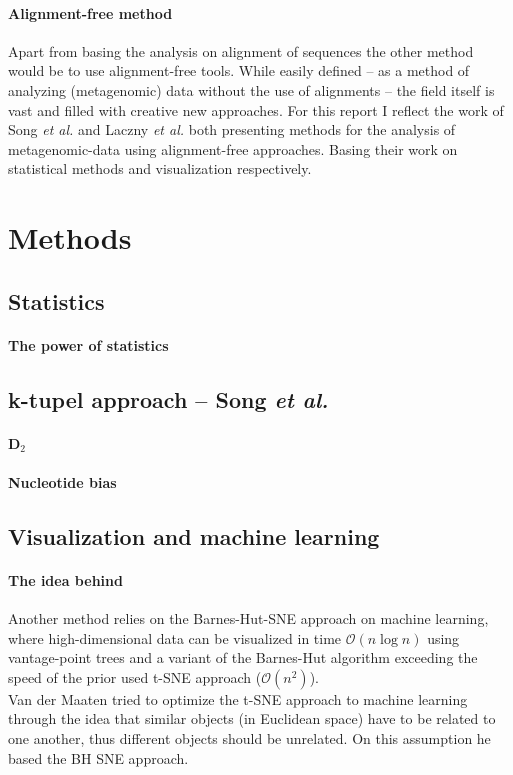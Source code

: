 \documentclass[twocolumn]{bmcart}%
\begin{document}
\paragraph*{Alignment-free method}
Apart from basing the analysis on alignment of sequences the other method would be to use alignment-free tools. While easily defined -- as a method of analyzing (metagenomic) data without the use of alignments -- the field itself is vast and filled with creative new approaches. For this report I reflect the work of Song \textit{et al.} \cite{doi:10.1093/bib/bbt067} and Laczny \textit{et al.} \cite{Laczny2014} both presenting methods for the analysis of metagenomic-data using alignment-free approaches. Basing their work on statistical methods and visualization respectively.
\section*{Methods}
\subsection*{Statistics}
\paragraph*{The power of statistics}

\subsection*{k-tupel approach -- Song \textit{et al.}}
\paragraph*{D$_2$}
\paragraph*{Nucleotide bias}
\subsection*{Visualization and machine learning}
\paragraph*{The idea behind}
Another method relies on the Barnes-Hut-SNE\cite{DBLP:journals/corr/abs-1301-3342} approach on machine learning, where high-dimensional data can be visualized in time $\mathcal{O}(n \log n)$ using vantage-point trees and a variant of the Barnes-Hut algorithm exceeding the speed of the prior used t-SNE approach ($\mathcal{O}(n^2)$).\\
Van der Maaten tried to optimize the t-SNE approach to machine learning through the idea that similar objects (in Euclidean space) have to be related to one another, thus different objects should be unrelated. On this assumption he based the BH SNE approach.
\end{document}
